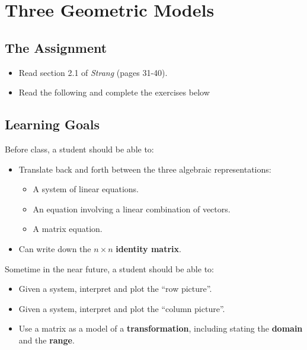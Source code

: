 \documentclass[10pt,]{book}
\newcommand{\terminology}[1]{\textbf{#1}}
\theoremstyle{plain}
\theoremstyle{definition}
\numberwithin{equation}{section}
\begin{document}
\section[Three Geometric Models]{Three Geometric Models}\label{three-pictures}
\typeout{************************************************}
\typeout{************************************************}
\subsection[The Assignment]{The Assignment}\label{subsection-19}
\begin{itemize}
\item{}
        Read section 2.1 of \emph{Strang} (pages 31-40).
      \item{}
        Read the following and complete the exercises below
      \end{itemize}
\typeout{************************************************}
\typeout{************************************************}
\subsection[Learning Goals]{Learning Goals}\label{subsection-20}

      Before class, a student should be able to:
\begin{itemize}
\item{}Translate back and forth between the three algebraic representations:
        \begin{itemize}
\item{}
            A system of linear equations.
          \item{}
            An equation involving a linear combination of vectors.
          \item{}
            A matrix equation.
          \end{itemize}

      \item{}
        Can write down the \(n \times n\) \terminology{identity matrix}.
      \end{itemize}
\par

      Sometime in the near future, a student should be able to:
\begin{itemize}
\item{}Given a system, interpret and plot the ``row picture''.\item{}Given a system, interpret and plot the ``column picture''.\item{}Use a matrix as a model of a \terminology{transformation}, including stating
        the \terminology{domain} and the \terminology{range}.\end{itemize}
\typeout{************************************************}
\typeout{************************************************}
\end{document}
